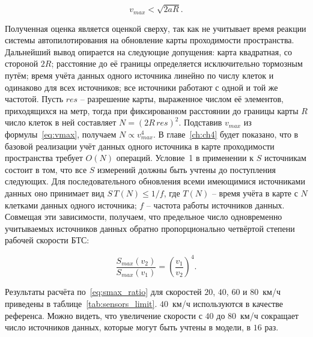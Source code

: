 \begin{equation}
	v_{max} < \sqrt{2aR}.
	\label{eq:vmax}
\end{equation}

Полученная оценка является оценкой сверху, так как не учитывает время реакции системы автопилотирования на обновление карты проходимости пространства. Дальнейший вывод опирается на следующие допущения: карта квадратная, со стороной $2R$; расстояние до её границы определяется исключительно тормозным путём; время учёта данных одного источника линейно по числу клеток и одинаково для всех источников; все источники работают с одной и той же частотой. Пусть $res$ -- разрешение карты, выраженное числом её элементов, приходящихся на метр, тогда при фиксированном расстоянии до границы карты $R$ число клеток в ней составляет $N = \left(2R\,res\right)^2$. Подставив $v_{max}$ из формулы~\cref{eq:vmax}, получаем $N \propto v_{max}^4$. В главе~\cref{ch:ch4} будет показано, что в базовой реализации учёт данных одного источника в карте проходимости пространства требует $O(N)$ операций. Условие~1 в применении к $S$ источникам состоит в том, что все $S$ измерений должны быть учтены до поступления следующих. Для последовательного обновления всеми имеющимися источниками данных оно принимает вид $S\,T(N) \le 1/f$, где $T(N)$ -- время учёта в карте с $N$ клетками данных одного источника; $f$ -- частота работы источников данных. Совмещая эти зависимости, получаем, что предельное число одновременно учитываемых источников данных обратно пропорционально четвёртой степени рабочей скорости БТС:

\begin{equation}
	\frac{S_{max}(v_2)}{S_{max}(v_1)} = \left(\frac{v_1}{v_2}\right)^{4}.
	\label{eq:smax_ratio}
\end{equation}

Результаты расчёта по~\cref{eq:smax_ratio} для скоростей $20$, $40$, $60$ и $80$~км/ч приведены в таблице~\cref{tab:sensors_limit}. $40$~км/ч используются в качестве референса. Можно видеть, что увеличение скорости с $40$ до $80$~км/ч сокращает число источников данных, которые могут быть учтены в модели, в $16$ раз.

